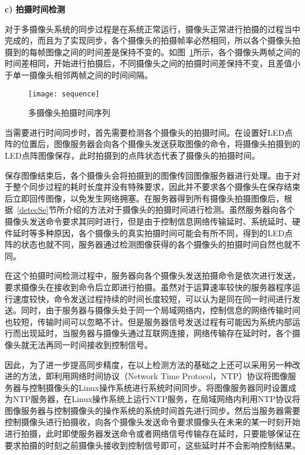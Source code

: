 \textbf{c) 拍摄时间检测}

对于多摄像头系统的同步过程是在系统正常运行，摄像头正常进行拍摄的过程当中完成的，而且为了实现同步，各个摄像头的拍摄帧率必然相同，所以各个摄像头拍摄到的每帧图像之间的时间差是保持不变的。如图~\ref{sequence}所示，各个摄像头两帧之间的时间差相同，开始进行拍摄后，不同摄像头之间的拍摄时间差保持不变，且差值小于单一摄像头相邻两帧之间的时间间隔。

\begin{figure}[h] 
  \centering
  \texttt{[image: sequence]}
  \caption{多摄像头拍摄时间序列}
    \label{sequence}
\end{figure}

当需要进行时间同步时，首先需要检测各个摄像头的拍摄时间。在设置好LED点阵的位置后，图像服务器会向各个摄像头发送获取图像的命令，将摄像头拍摄到的LED点阵图像保存，此时拍摄到的点阵状态代表了摄像头的拍摄时间。

保存图像结束后，各个摄像头会将拍摄到的图像传回图像服务器进行处理。由于对于整个同步过程的耗时长度并没有特殊要求，因此并不要求各个摄像头在保存结束后立即回传图像，以免发生网络拥塞。在服务器得到所有摄像头拍摄图像后，根据~\ref{detecSe}节所介绍的方法对于摄像头的拍摄时间进行检测。虽然服务器向各个摄像头发送命令要求其同时进行，但是由于控制信息网络传输延时、系统延时、硬件延时等多种原因，各个摄像头的真实拍摄时间可能会有所不同，得到的LED点阵的状态也就不同，服务器通过检测图像获得的各个摄像头的拍摄时间自然也就不同。

在这个拍摄时间检测过程中，服务器向各个摄像头发送拍摄命令是依次进行发送，要求摄像头在接收到命令后立即进行拍摄。虽然对于运算速率较快的服务器程序运行速度较快，命令发送过程持续的时间长度较短，可以认为是同在同一时间进行发送。同时，由于服务器与摄像头处于同一个局域网络内，控制信息的网络传输时间也较短，传输时间可以忽略不计。但是服务器信号发送过程有可能因为系统内部运行而出现延时，当服务器与摄像头通过互联网连接，网络传输存在延时时，各个摄像头就无法再同一时间接收到控制信号。

因此，为了进一步提高同步精度，在以上检测方法的基础之上还可以采用另一种改进的方法，即利用网络时间协议（Network Time Protocol，NTP）协议将图像服务器与控制摄像头的Linux操作系统进行系统时间同步。将图像服务器同时设置成为NTP服务器，在Linux操作系统上运行NTP服务，在局域网络内利用NTP协议将图像服务器与控制摄像头的操作系统的系统时间首先进行同步。然后当服务器需要控制摄像头进行拍摄收，向各个摄像头发送命令要求摄像头在未来的某一时刻开始进行拍摄，此时即使服务器发送命令或者网络信号传输存在延时，只要能够保证在要求拍摄的时刻之前摄像头接收到控制信号即可，这些延时并不会影响控制结果。

